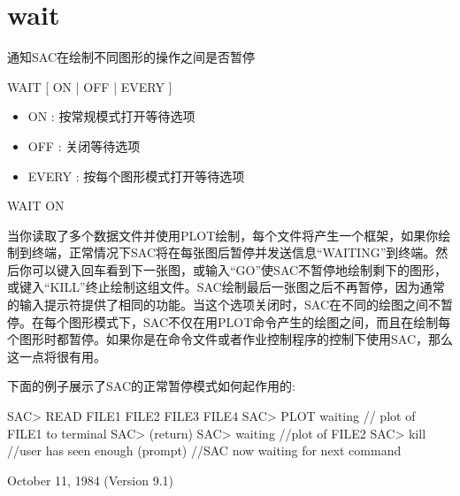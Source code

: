 \section{wait}
\label{cmd:wait}

通知SAC在绘制不同图形的操作之间是否暂停

WAIT [ ON | OFF | EVERY ]

\begin{itemize}
\item ON : 按常规模式打开等待选项 
\item OFF : 关闭等待选项 
\item EVERY : 按每个图形模式打开等待选项
\end{itemize}

WAIT ON

当你读取了多个数据文件并使用PLOT绘制，每个文件将产生一个框架，如果你绘制到终端，正常情况下SAC将在每张图后暂停并发送信息``WAITING''到终端。然后你可以键入回车看到下一张图，或输入``GO''使SAC不暂停地绘制剩下的图形，或键入``KILL''终止绘制这组文件。SAC绘制最后一张图之后不再暂停，因为通常的输入提示符提供了相同的功能。当这个选项关闭时，SAC在不同的绘图之间不暂停。在每个图形模式下，SAC不仅在用PLOT命令产生的绘图之间，而且在绘制每个图形时都暂停。如果你是在命令文件或者作业控制程序的控制下使用SAC，那么这一点将很有用。

下面的例子展示了SAC的正常暂停模式如何起作用的:
\begin{SACCode}
SAC> READ FILE1 FILE2 FILE3 FILE4
SAC> PLOT
  waiting  // plot of FILE1 to terminal
SAC> (return)
SAC> waiting  //plot of FILE2
SAC> kill  //user has seen enough
  (prompt) //SAC now waiting for next command
\end{SACCode}

October 11, 1984 (Version 9.1)

